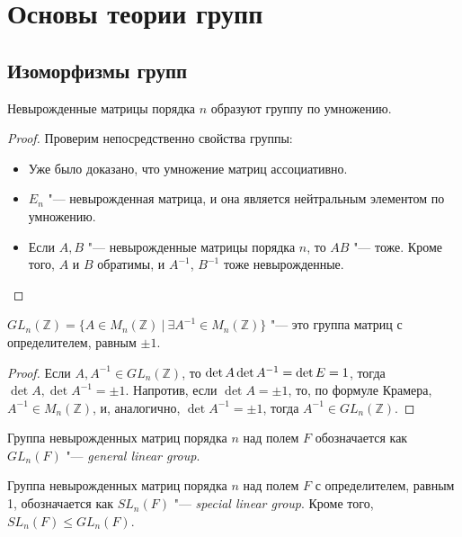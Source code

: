 \section{Основы теории групп}
	
\subsection{Изоморфизмы групп}

\begin{proposition}
	Невырожденные матрицы порядка $n$ образуют группу по умножению.
\end{proposition}

\begin{proof}
	Проверим непосредственно свойства группы:
	\begin{itemize}
		\item Уже было доказано, что умножение матриц ассоциативно.
		\item $E_n$ "--- невырожденная матрица, и она является нейтральным элементом по умножению.
		\item Если $A, B$ "--- невырожденные матрицы порядка $n$, то $AB$ "--- тоже. Кроме того, $A$ и $B$ обратимы, и $A^{-1}$, $B^{-1}$ тоже невырожденные.
	\end{itemize}
\end{proof}

\begin{proposition}
$GL_n(\mathbb{Z}) = \{A \in M_n(\mathbb{Z})~|~\exists A^{-1} \in M_n(\mathbb{Z})\}$ "--- это группа матриц с определителем, равным $\pm1$.
\end{proposition}

\begin{proof}
Если $A, A^{-1} \in GL_n(\mathbb{Z})$, то $\det{A}\det{A^{-1}} = \det{E} \hm{=} 1$, тогда $\det{A}, \det{A^{-1}} = \pm1$. Напротив, если $\det{A} = \pm 1$, то, по формуле Крамера, $A^{-1} \in M_n(\mathbb{Z})$, и, аналогично, $\det{A^{-1}} = \pm1$, тогда $A^{-1} \in GL_n(\mathbb{Z})$.
\end{proof}

\begin{definition}
	Группа невырожденных матриц порядка $n$ над полем $F$ обозначается как $GL_n(F)$ "--- \textit{general linear group}.
\end{definition}

\begin{definition}
	Группа невырожденных матриц порядка $n$ над полем $F$ с определителем, равным 1, обозначается как $SL_n(F)$ "--- \textit{special linear group}. Кроме того, $SL_n(F) \le GL_n(F)$.
\end{definition}

